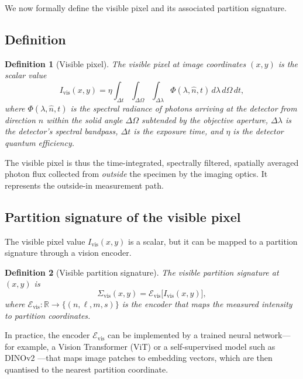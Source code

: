 \documentclass[11pt,twocolumn,a4paper]{article}
\newtheorem{definition}{Definition}
\newcommand{\Sigvis}{\Sigma_{\mathrm{vis}}}
\newcommand{\R}{\mathbb{R}}
\begin{document}
We now formally define the visible pixel and its associated partition signature.

\subsection{Definition}

\begin{definition}[Visible pixel]\label{def:vispixel}
The visible pixel at image coordinates $(x, y)$ is the scalar value
\begin{equation}\label{eq:vispixel}
I_{\mathrm{vis}}(x,y) = \eta \int_{\Delta t} \int_{\Delta\Omega} \int_{\Delta\lambda} \Phi(\lambda, \hat{n}, t)\, d\lambda\, d\Omega\, dt,
\end{equation}
where $\Phi(\lambda, \hat{n}, t)$ is the spectral radiance of photons arriving at the detector from direction $\hat{n}$ within the solid angle $\Delta\Omega$ subtended by the objective aperture, $\Delta\lambda$ is the detector's spectral bandpass, $\Delta t$ is the exposure time, and $\eta$ is the detector quantum efficiency.
\end{definition}

The visible pixel is thus the time-integrated, spectrally filtered, spatially averaged photon flux collected from \emph{outside} the specimen by the imaging optics.
It represents the outside-in measurement path.

\subsection{Partition signature of the visible pixel}

The visible pixel value $I_{\mathrm{vis}}(x,y)$ is a scalar, but it can be mapped to a partition signature through a vision encoder.

\begin{definition}[Visible partition signature]\label{def:vissig}
The visible partition signature at $(x,y)$ is
\begin{equation}\label{eq:vissig}
\Sigvis(x,y) = \mathcal{E}_{\mathrm{vis}}\bigl[I_{\mathrm{vis}}(x,y)\bigr],
\end{equation}
where $\mathcal{E}_{\mathrm{vis}}: \R \to \{(n,\ell,m,s)\}$ is the encoder that maps the measured intensity to partition coordinates.
\end{definition}

In practice, the encoder $\mathcal{E}_{\mathrm{vis}}$ can be implemented by a trained neural network---for example, a Vision Transformer (ViT) \citep{Dosovitskiy2021} or a self-supervised model such as DINOv2 \citep{Oquab2024}---that maps image patches to embedding vectors, which are then quantised to the nearest partition coordinate.
\end{document}
